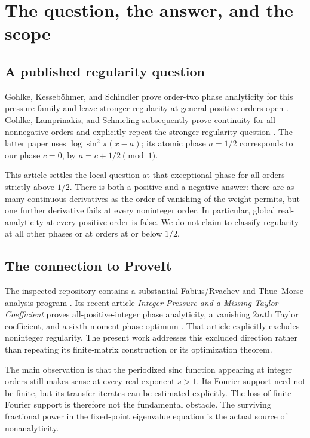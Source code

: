 \documentclass[11pt,a4paper]{article}
\numberwithin{equation}{section}
\theoremstyle{definition}
\theoremstyle{remark}
\begin{document}
\hypersetup{pageanchor=true}
\begingroup
\small
\setlength{\parskip}{0pt}
\tableofcontents
\endgroup
\newpage

\section{The question, the answer, and the scope}
\label{sec:intro}

\subsection{A published regularity question}
Gohlke, Kesseb\"ohmer, and Schindler prove order-two phase analyticity for
this pressure family and leave stronger regularity at general positive
orders open \cite[Theorem~2.7 and subsequent discussion]{GKS}.
Gohlke, Lamprinakis, and Schmeling subsequently prove continuity for all
nonnegative orders and explicitly repeat the stronger-regularity question
\cite[Theorems~2.2--2.3 and the following paragraph]{GLS}.
The latter paper uses $\log\sin^2\pi(x-a)$; its atomic phase $a=1/2$
corresponds to our phase $c=0$, by $a=c+1/2\pmod1$.

This article settles the local question at that exceptional phase for all
orders strictly above $1/2$. There is both a positive and a negative answer:
there are as many continuous derivatives as the order of vanishing of the
weight permits, but one further derivative fails at every noninteger
order. In particular, global real-analyticity at every positive order is
false. We do not claim to classify regularity at all other phases or at
orders at or below $1/2$.

\subsection{The connection to ProveIt}
The inspected repository contains a substantial Fabius/Rvachev and
Thue--Morse analysis program \cite{Repo}. Its recent article
\emph{Integer Pressure and a Missing Taylor Coefficient} proves
all-positive-integer phase analyticity, a vanishing $2m$th Taylor
coefficient, and a sixth-moment phase optimum \cite{IntegerRepo}.
That article explicitly excludes noninteger regularity. The present work
addresses this excluded direction rather than repeating its finite-matrix
construction or its optimization theorem.

The main observation is that the periodized sinc function appearing at
integer orders still makes sense at every real exponent $s>1$. Its
Fourier support need not be finite, but its transfer iterates can be
estimated explicitly. The loss of finite Fourier support is therefore
not the fundamental obstacle. The surviving fractional power in the
fixed-point eigenvalue equation is the actual source of nonanalyticity.
\end{document}
